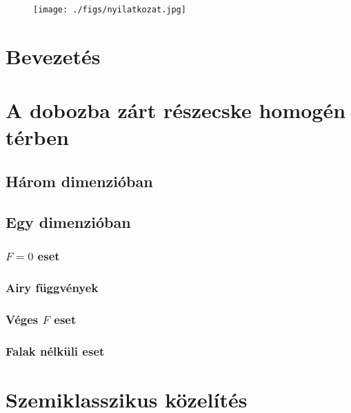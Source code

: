 \documentclass[pdftex,12pt,a4paper]{article}
\begin{document}
\addtolength{\marginparwidth}{50pt}

\begin{figure}[H]
	\centering
	\texttt{[image: ./figs/nyilatkozat.jpg]}
\end{figure}
\newpage



\newpage
{}
{}
\tableofcontents
\listoffigures
\newpage
{}

\section{Bevezetés}
	
\section{A dobozba zárt részecske homogén térben}
	
	\subsection{Három dimenzióban}
		
	\subsection{Egy dimenzióban}
			
		\subsubsection{$F=0$ eset}
			
		\subsubsection{Airy függvények}
			
		\subsubsection{Véges $F$ eset}
			
		\subsubsection{Falak nélküli eset}
			
\section{Szemiklasszikus közelítés}
	
\end{document}
